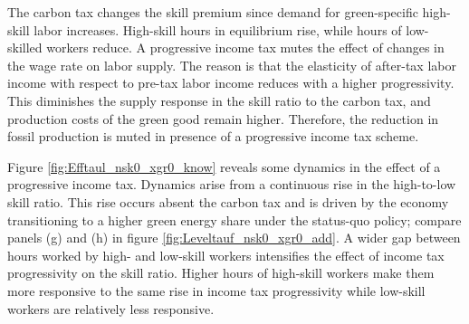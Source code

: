     The carbon tax changes the skill premium since demand for green-specific high-skill labor increases. High-skill hours in equilibrium rise, while hours of low-skilled workers reduce.  A progressive income tax mutes the effect of changes in the wage rate on labor supply. The reason is that the elasticity of after-tax labor income with respect to pre-tax labor income reduces with a higher progressivity. This diminishes the supply response in the skill ratio to the carbon tax, and production costs of the green good remain higher. Therefore, the reduction in fossil production is muted in presence of a progressive income tax scheme. 
    
    Figure \ref{fig:Efftaul_nsk0_xgr0_know} reveals some dynamics in the effect of a progressive income tax. 
    Dynamics arise from a continuous rise in the high-to-low skill ratio. This rise occurs absent the carbon tax and is driven by the economy transitioning to a higher green energy share under the status-quo policy; compare panels (g) and (h) in figure \ref{fig:Leveltauf_nsk0_xgr0_add}. 
     A wider gap between hours worked by high- and low-skill workers intensifies the effect of income tax progressivity on the skill ratio. Higher hours of high-skill workers make them more responsive to the same rise in income tax progressivity while low-skill workers are relatively less responsive. 
    
    
    
    
   
